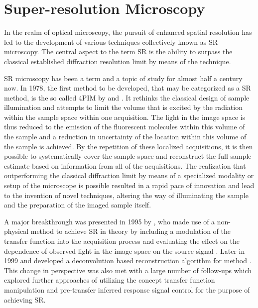 \setchapterpreamble[u]{\margintoc}
\chapter{Super-resolution Microscopy}

In the realm of optical microscopy, the pursuit of enhanced spatial resolution has led to the development of various 
    techniques collectively known as \ac{SR} microscopy.
The central aspect to the term \acl{SR} is the ability to surpass the classical established diffraction resolution
    limit by means of the technique.

\ac{SR} microscopy has been a term and a topic of study for almost half a century now.
In 1978, the first method to be developed, that may be categorized as a \ac{SR} method, is the so called
    \ac{4PIM} by  and  .
It rethinks the classical design of sample illumination and attempts to limit the volume that is excited by the
    radiation within the sample space within one acquisition.
The light in the image space is thus reduced to the emission of the fluorescent molecules within this volume of the 
    sample and a reduction in uncertainty of the location within this volume of the sample is achieved.
By the repetition of these localized acquisitions, it is then possible to systematically cover the sample space and
    reconstruct the full sample estimate based on information from all of the acquisitions.
The realization that outperforming the classical diffraction limit by means of a specialized modality or setup of the 
    microscope is possible resulted in a rapid pace of innovation and lead to the invention of novel techniques, 
    altering the way of illuminating the sample and the preparation of the imaged sample itself.

A major breakthrough was presented in 1995 by , who made use of a non-physical method to achieve 
    \ac{SR} in theory by including a modulation of the transfer function into the acquisition process and evaluating the 
    effect on the dependence of observed light in the image space on the source signal .
Later in 1999  and  developed a deconvolution based reconstruction algorithm
    for  method .
This change in perspective was also met with a large number of follow-ups which explored further approaches of
    utilizing the concept transfer function manipulation and pre-transfer inferred response signal control for the
    purpose of achieving \ac{SR}.

